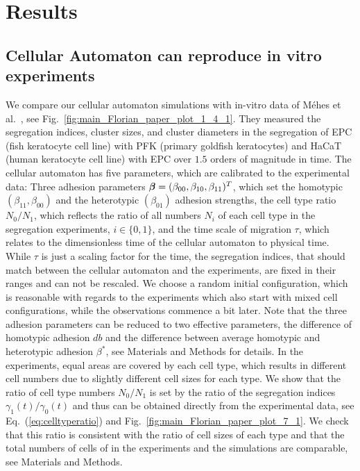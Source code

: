 \documentclass[10pt,letterpaper]{article}
\renewcommand{\eqref}[1]{Eq.~(\ref{eq:#1})}
\newcommand{\figref}[1]{Fig.~\ref{fig:#1}}
\begin{document}
\section*{Results}

\subsection*{Cellular Automaton can reproduce in vitro experiments}

We compare our cellular automaton simulations with in-vitro data of
Méhes et al.~\cite{MehMonNemVic2012}, see
\figref{main_Florian_paper_plot_1_4_1}. They measured the
segregation indices, cluster sizes, and cluster diameters in the segregation of EPC (fish
keratocyte cell line) with PFK (primary goldfish keratocytes) and
HaCaT (human keratocyte cell line) with EPC over $1.5$ orders of
magnitude in time. The cellular automaton has five parameters, which
are calibrated to the experimental data: Three adhesion parameters
$\text{\boldmath$\beta$}=(\beta_{00}, \beta_{10}, \beta_{11})^T$,
which set the homotypic $(\beta_{11}, \beta_{00})$ and the heterotypic
$(\beta_{01})$ adhesion strengths, the cell type ratio $N_0/N_1$, which
reflects the ratio of all numbers $N_i$ of each cell type in the
segregation experiments, $i\in\{0,1\}$, and the time scale of
migration $\tau$, which relates to the dimensionless time of the cellular
automaton to physical time. While $\tau$ is just a scaling factor for the
time, the segregation indices, that should match between the cellular automaton
and the experiments, are fixed in their ranges and can not be rescaled.
We choose a random initial configuration, which is reasonable with regards to the
experiments which also start with mixed cell configurations, while the
observations commence a bit later. Note that the three adhesion parameters
can be reduced to two effective parameters, the difference of
homotypic adhesion $db$ and the difference between average homotypic
and heterotypic adhesion $\beta^*$, see Materials and Methods for details.
In the experiments, equal areas are covered by each cell type, which
results in different cell numbers due to slightly different cell sizes
for each type. We show that the ratio of cell type numbers $N_0/N_1$
is set by the ratio of the segregation indices
$\gamma_1(t)/\gamma_0(t)$ and thus can be obtained directly from the
experimental data, see \eqref{celltyperatio} and
\figref{main_Florian_paper_plot_7_1}. We check that this ratio
is consistent with the ratio of cell sizes of each type and that the
total numbers of cells of in the experiments and the
simulations are comparable, see Materials and Methods.
\end{document}
